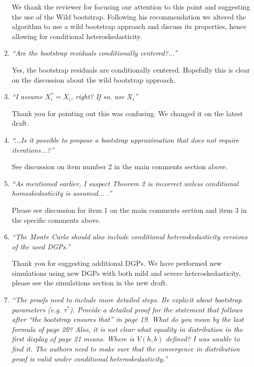 \documentclass[12pt,fleqn]{article}
\begin{document}
\begin{enumerate}
 We thank the reviewer for focusing our attention to this point and suggesting the use of the Wild bootstrap. Following his recommendation we altered the algorithm to use a wild bootstrap approach and discuss its properties, hence allowing for conditional heteroskedasticity.

\item \textit{``Are the bootstrap residuals conditionally centered?...''}

 Yes, the bootstrap residuals are conditionally centered. Hopefully this is clear on the discussion about the wild bootstrap approach.

\item \textit{``I assume $X_{i}^{*}=X_{i}$, right? If so, use $X_{i}$''}

Thank you for pointing out this was confusing. We changed it on the latest draft.

\item \textit{``...Is it possible to propose a bootstrap approximation that does not require iterations...?''}

See discussion on item number 2 in the main comments section above.

\item \textit{``As mentioned earlier, I suspect Theorem 2 is incorrect unless conditional homoskedasticity is assumed... .''}

  Please see discussion for item 1 on the main comments section and item 3 in the specific comments above.

\item \textit{``The Monte Carlo should also include conditional heteroskedasticity versions of the used DGPs.''}

  Thank you for suggesting additional DGPs. We have performed new simulations using new DGPs with both mild and severe heteroskedasticity, please see the simulations section in the new draft.

\item \textit{``The proofs need to include more detailed steps. Be explicit about bootstrap parameters (e.g. $\tau^{*}$). Provide a detailed proof for the statement that follows after ``the bootstrap ensures that'' in page 19. What do you mean by the last formula of page 20? Also, it is not clear what equality in distribution in the first display of page 21 means. Where is $V(h,b)$ defined? I was unable to find it. The authors need to make sure that the convergence in distribution proof is valid under conditional heteroskedasticity.''}


\end{enumerate}
\end{document}
